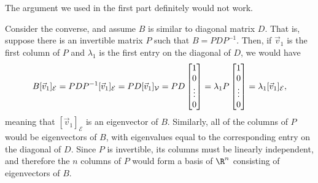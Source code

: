 \begin{parts}
\begin{solution}
				The argument we used in the first part definitely would not work.

				Consider the converse, and assume $B$ is similar to diagonal 
				matrix $D$. That is, suppose there is an invertible matrix 
				$P$ such that $B=PDP^{-1}$. Then, if $\vec v_1$ is the first 
				column of $P$ and $\lambda_1$ is the first entry on	the diagonal
				of $D$, we would have
				\[
					B[\vec v_1]_{\mathcal E}
					=PDP^{-1}[\vec v_1]_{\mathcal E}
					=PD[\vec v_1]_{\mathcal V}
					=PD\begin{bmatrix}1\\0\\\vdots\\0\end{bmatrix}
					=\lambda_1P\begin{bmatrix}1\\0\\\vdots\\0\end{bmatrix}
					=\lambda_1[\vec v_1]_{\mathcal E},
				\]
				meaning that $[\vec v_1]_{\mathcal E}$ is an eigenvector of $B$. Similarly, all
				of the columns of $P$ would be eigenvectors of $B$, with eigenvalues
				equal to the corresponding entry on the diagonal of $D$. Since $P$ is 
				invertible, its columns must be linearly independent, and therefore
				the $n$ columns of $P$ would form a basis of $\R^n$ consisting of
				eigenvectors of $B$. 
			\end{solution}
	\end{parts}

